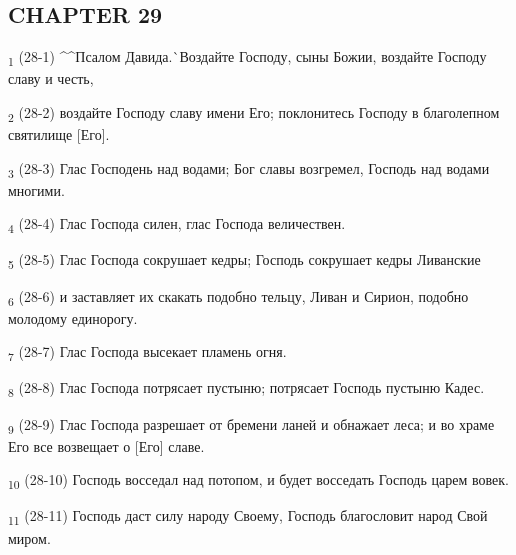 \subsection{CHAPTER 29}
\begin{tcolorbox}
\textsubscript{1} (28-1) ^^Псалом Давида.^^ Воздайте Господу, сыны Божии, воздайте Господу славу и честь,
\end{tcolorbox}
\begin{tcolorbox}
\textsubscript{2} (28-2) воздайте Господу славу имени Его; поклонитесь Господу в благолепном святилище [Его].
\end{tcolorbox}
\begin{tcolorbox}
\textsubscript{3} (28-3) Глас Господень над водами; Бог славы возгремел, Господь над водами многими.
\end{tcolorbox}
\begin{tcolorbox}
\textsubscript{4} (28-4) Глас Господа силен, глас Господа величествен.
\end{tcolorbox}
\begin{tcolorbox}
\textsubscript{5} (28-5) Глас Господа сокрушает кедры; Господь сокрушает кедры Ливанские
\end{tcolorbox}
\begin{tcolorbox}
\textsubscript{6} (28-6) и заставляет их скакать подобно тельцу, Ливан и Сирион, подобно молодому единорогу.
\end{tcolorbox}
\begin{tcolorbox}
\textsubscript{7} (28-7) Глас Господа высекает пламень огня.
\end{tcolorbox}
\begin{tcolorbox}
\textsubscript{8} (28-8) Глас Господа потрясает пустыню; потрясает Господь пустыню Кадес.
\end{tcolorbox}
\begin{tcolorbox}
\textsubscript{9} (28-9) Глас Господа разрешает от бремени ланей и обнажает леса; и во храме Его все возвещает о [Его] славе.
\end{tcolorbox}
\begin{tcolorbox}
\textsubscript{10} (28-10) Господь восседал над потопом, и будет восседать Господь царем вовек.
\end{tcolorbox}
\begin{tcolorbox}
\textsubscript{11} (28-11) Господь даст силу народу Своему, Господь благословит народ Свой миром.
\end{tcolorbox}
